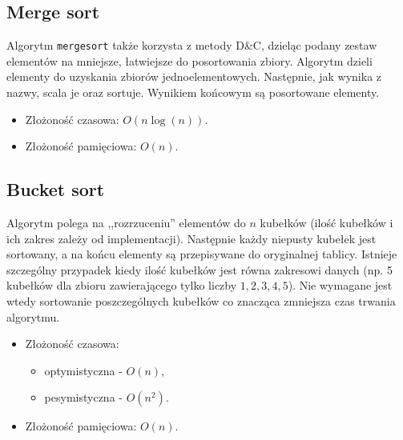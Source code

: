 \documentclass{article}
\begin{document}
    \subsection{Merge sort}
    Algorytm \texttt{mergesort} także korzysta z metody D\&C, dzieląc podany zestaw elementów na mniejsze, łatwiejsze do posortowania zbiory. Algorytm dzieli elementy do uzyskania zbiorów jednoelementowych. Następnie, jak wynika z nazwy, scala je oraz sortuje. Wynikiem końcowym są posortowane elementy.
    \begin{itemize}
        \item Złożoność czasowa: $O\left(n\log \left(n\right)\right)$.
        \item Złożoność pamięciowa: $O\left(n\right)$.
    \end{itemize}

    \newpage
    \subsection{Bucket sort}
    Algorytm polega na ,,rozrzuceniu'' elementów do $n$ kubełków (ilość kubełków i ich zakres zależy od implementacji). Następnie każdy niepusty kubełek jest sortowany, a na końcu elementy są przepisywane do oryginalnej tablicy. Istnieje szczególny przypadek kiedy ilość kubełków jest równa zakresowi danych (np. 5 kubełków dla zbioru zawierającego tylko liczby $1, 2, 3, 4, 5$). Nie wymagane jest wtedy sortowanie poszczególnych kubełków co znacząca zmniejsza czas trwania algorytmu.
    \begin{itemize}
        \item Złożoność czasowa:
        \begin{itemize}
            \item optymistyczna - $O\left(n\right)$,
            \item pesymistyczna - $O\left(n^2\right)$.
        \end{itemize}
        \item Złożoność pamięciowa: $O\left(n\right)$.
    \end{itemize}
    
\end{document}
